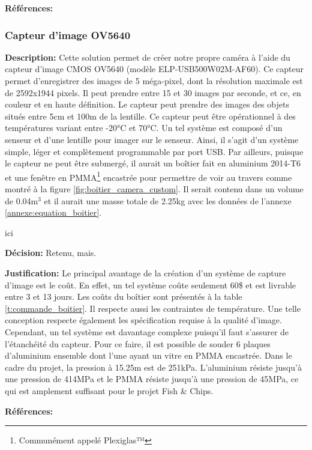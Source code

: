 \textbf{Références:} \cite{GoFishCam} \cite{GoFishCam_resolution}


\subsubsection{Capteur d'image OV5640}
\label{subsubsection:camera_custom}

\textbf{Description:} Cette solution permet de créer notre propre caméra à l'aide du capteur d'image CMOS OV5640 (modèle ELP-USB500W02M-AF60). Ce capteur permet d'enregistrer des images de 5 méga-pixel, dont la résolution maximale est de 2592x1944 pixels. Il peut prendre entre 15 et 30 images par seconde, et ce, en couleur et en haute définition. Le capteur peut prendre des images des objets situés entre 5cm et 100m de la lentille. Ce capteur peut être opérationnel à des températures variant entre -20°C et 70°C. Un tel système est composé d'un senseur et d'une lentille pour imager sur le senseur. Ainsi, il s'agit d'un système simple, léger et complètement programmable par port USB. Par ailleurs, puisque le capteur ne peut être submergé, il aurait un boîtier fait en aluminium 2014-T6 et une fenêtre en PMMA\footnote{Communément appelé Plexiglas™} encastrée pour permettre de voir au travers comme montré à la figure \ref{fig:boitier_camera_custom}. Il serait contenu dans un volume de 0.04m$^3$ et il aurait une masse totale de 2.25kg avec les données de l'annexe \ref{annexe:equation_boitier}.

ici

\textbf{Décision:} Retenu, mais.

\textbf{Justification:} Le principal avantage de la création d'un système de capture d'image est le coût. En effet, un tel système coûte seulement 60\$ et est livrable entre 3 et 13 jours. Les coûts du boîtier sont présentés à la table \ref{t:commande_boitier}. Il respecte aussi les contraintes de température. Une telle conception respecte également les spécification requise à la qualité d'image. Cependant, un tel système est davantage complexe puisqu'il faut s'assurer de l'étanchéité du capteur. Pour ce faire, il est possible de souder 6 plaques d'aluminium ensemble dont l'une ayant un vitre en PMMA encastrée. Dans le cadre du projet, la pression à 15.25m est de 251kPa. L'aluminium résiste jusqu'à une pression de 414MPa et le PMMA résiste jusqu'à une pression de 45MPa, ce qui est amplement suffisant pour le projet Fish \& Chips.

\textbf{Références:} \cite{OV5640} \cite{OV5640_coûts} \cite{ASM} \cite{Glass}

